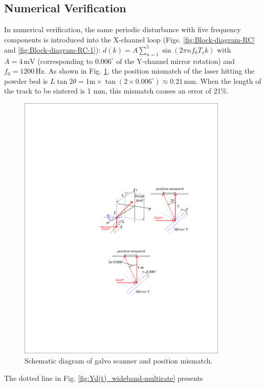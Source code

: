 \documentclass [11pt, proquest] {uwthesis}[2020/02/24]
\begin{document}
\subsection{Numerical Verification} \label{subsec:Numerical-Verification-Galvo-Scanner}

In numerical verification, the same periodic disturbance with five
frequency components is introduced into the X-channel loop (Figs.
\ref{fig:Block-diagram-RC} and \ref{fig:Block-diagram-RC-1}): $d(k)=A\sum_{n=1}^{5}\sin(2\pi nf_{0}T_{s}k)$
with $A=4\,\text{mV}$ (corresponding to $0.006^{\circ}$ of the Y-channel
mirror rotation) and $f_{0}=1200\,\text{Hz}$. As shown in Fig. \ref{fig:Schematic-diagram-of},
the position mismatch of the laser hitting the powder bed is $L\tan2\theta=1\text{m}\times\tan(2\times0.006^{\circ})\approx0.21\,\text{mm}$.
When the length of the track to be sintered is 1 mm, this mismatch
causes an error of 21\%. 
\begin{figure}[!ht]
\begin{centering}
\includegraphics[width=10cm]{Fractional-order-RC/laser scanning mirror rotation}
\par\end{centering}
\caption{\label{fig:Schematic-diagram-of}Schematic diagram of galvo scanner
and position mismatch.}
\end{figure}
The dotted line in Fig. \ref{fig:Yd(t)_wideband-multirate} presents
\end{document}
